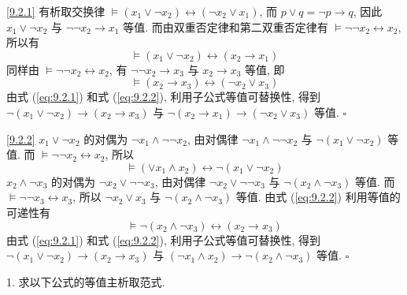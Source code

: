 \documentclass[boxes]{homework}
\begin{document}
\begin{solution}
    \ref{9.2.1} 有析取交换律 $\vDash (x_1\lor \lnot x_2)\leftrightarrow(\lnot x_2\lor x_1)$, 而 $p\lor q = \lnot p\to q$, 因此 $x_1\lor \lnot x_2$ 与 $\lnot\lnot x_2\to x_1$ 等值. 而由双重否定律和第二双重否定律有 $\vDash \lnot\lnot x_2\leftrightarrow x_2$, 所以有
    \begin{equation}\label{eq:9.2.1}
        \vDash (x_1\lor \lnot x_2)\leftrightarrow(x_2\to x_1)
    \end{equation}
    同样由 $\vDash \lnot\lnot x_2\leftrightarrow x_2$, 有 $\lnot\lnot x_2\to x_3$ 与 $x_2\to x_3$ 等值, 即
    \begin{equation}\label{eq:9.2.2}
        \vDash (x_2\to x_3)\leftrightarrow(\lnot x_2\lor x_3)
    \end{equation}
    由式 (\ref{eq:9.2.1}) 和式 (\ref{eq:9.2.2}), 利用子公式等值可替换性, 得到 $\lnot(x_1\lor\lnot x_2)\to(x_2\to x_3)$ 与 $\lnot (x_2\to x_1)\to (\lnot x_2\lor x_3)$ 等值. $\square$

    \ref{9.2.2} $x_1\lor \lnot x_2$ 的对偶为 $\lnot x_1\land \lnot\lnot x_2$, 由对偶律 $\lnot x_1\land \lnot\lnot x_2$ 与 $\lnot(x_1\lor\lnot x_2)$ 等值. 而 $\vDash \lnot\lnot x_2\leftrightarrow x_2$, 所以
    \begin{equation}\label{eq:9.2.3}
        \vDash (\lor x_1\land x_2)\leftrightarrow\lnot(x_1\lor\lnot x_2)
    \end{equation}
    $x_2\land\lnot x_3$ 的对偶为 $\lnot x_2\lor \lnot\lnot x_3$, 由对偶律 $\lnot x_2\lor \lnot\lnot x_3$ 与 $\lnot(x_2\land\lnot x_3)$ 等值. 而 $\vDash \lnot\lnot x_3\leftrightarrow x_3$, 所以 $\lnot x_2\lor x_3$ 与 $\lnot(x_2\land\lnot x_3)$ 等值. 由式 (\ref{eq:9.2.2}) 利用等值的可递性有
    \begin{equation}\label{eq:9.2.4}
        \vDash \lnot(x_2\land \lnot x_3)\leftrightarrow(x_2\to x_3)
    \end{equation}
    由式 (\ref{eq:9.2.1}) 和式 (\ref{eq:9.2.2}), 利用子公式等值可替换性, 得到 $\lnot(x_1\lor\lnot x_2)\to(x_2\to x_3)$ 与 $(\lnot x_1\land x_2)\to \lnot (x_2\land\lnot x_3)$ 等值. $\square$
\end{solution}
\begin{problem}
1. 求以下公式的等值主析取范式.
\end{problem}
\end{document}

